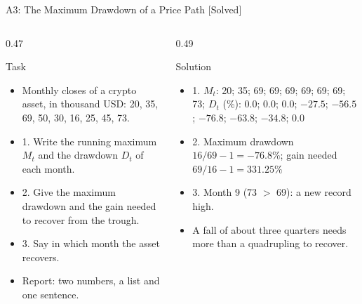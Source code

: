 \begin{frame}{A3: The Maximum Drawdown of a Price Path [Solved]}
\itemsize{\scriptsize}
\begin{columns}[T]
\begin{column}{0.47\textwidth}
\begin{block}{Task}
\begin{itemize}
    \item Monthly closes of a crypto asset, in thousand USD: 20, 35, 69, 50, 30, 16, 25, 45, 73.
    \item 1. Write the running maximum $M_t$ and the drawdown $D_t$ of each month.
    \item 2. Give the maximum drawdown and the gain needed to recover from the trough.
    \item 3. Say in which month the asset recovers.
    \item Report: two numbers, a list and one sentence.
\end{itemize}
\end{block}
\end{column}
\begin{column}{0.49\textwidth}
\begin{exampleblock}{Solution}
\begin{itemize}
    \item 1. $M_t$: 20; 35; 69; 69; 69; 69; 69; 69; 73; $D_t$ (\%): $0.0$; $0.0$; $0.0$; $-27.5$; $-56.5$; $-76.8$; $-63.8$; $-34.8$; $0.0$
    \item 2. Maximum drawdown $16/69 - 1 = -76.8\%$; gain needed $69/16 - 1 = 331.25\%$
    \item 3. Month 9 (73 $>$ 69): a new record high.
    \item A fall of about three quarters needs more than a quadrupling to recover.
\end{itemize}
\end{exampleblock}
\end{column}
\end{columns}
\end{frame}

